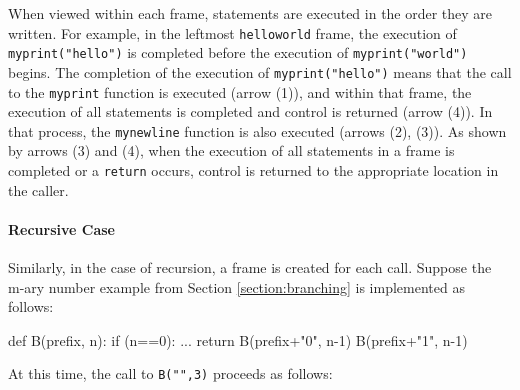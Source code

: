 When viewed within each frame, statements are executed in the order they are written. For example, in the leftmost \texttt{helloworld} frame, the execution of \texttt{myprint("hello")} is completed before the execution of \texttt{myprint("world")} begins.
The completion of the execution of \texttt{myprint("hello")} means that the call to the \texttt{myprint} function is executed (arrow (1)), and within that frame, the execution of all statements is completed and control is returned (arrow (4)). In that process, the \texttt{mynewline} function is also executed (arrows (2), (3)).
As shown by arrows (3) and (4), when the execution of all statements in a frame is completed or a \texttt{return} occurs, control is returned to the appropriate location in the caller.

\paragraph{Recursive Case} Similarly, in the case of recursion, a frame is created for each call.
Suppose the m-ary number example from Section \ref{section:branching} is implemented as follows:

\begin{pybox}[emph={B}]
def B(prefix, n):
    if (n==0):
        ...
        return
    B(prefix+"0", n-1)
    B(prefix+"1", n-1)
\end{pybox}

At this time, the call to \texttt{B("",3)} proceeds as follows:

